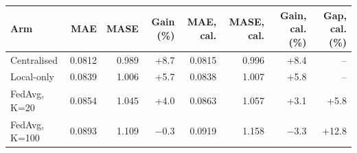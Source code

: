 \begin{tabular}{lrrrrrrr}
\toprule
Arm & MAE & MASE & Gain (\%) & MAE, cal. & MASE, cal. & Gain, cal. (\%) & Gap, cal. (\%) \\
\midrule
Centralised & 0.0812 & 0.989 & +8.7 & 0.0815 & 0.996 & +8.4 & -- \\
Local-only & 0.0839 & 1.006 & +5.7 & 0.0838 & 1.007 & +5.8 & -- \\
FedAvg, K=20 & 0.0854 & 1.045 & +4.0 & 0.0863 & 1.057 & +3.1 & +5.8 \\
FedAvg, K=100 & 0.0893 & 1.109 & −0.3 & 0.0919 & 1.158 & −3.3 & +12.8 \\
\bottomrule
\end{tabular}
